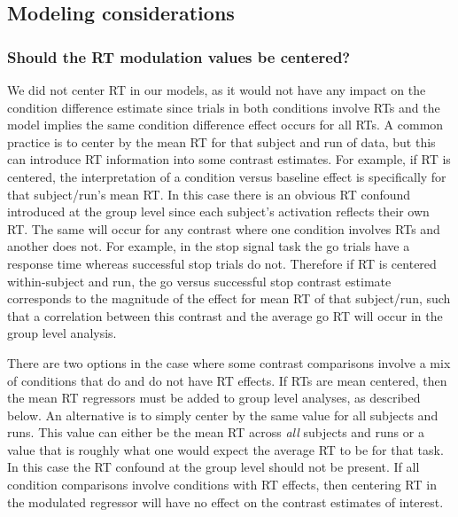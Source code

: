 \documentclass[titlepage,12pt] {article}
\begin{document}
\subsection*{Modeling considerations}


\subsubsection*{Should the RT modulation values be centered?}
We did not center RT in our models, as it would not have any impact on the condition difference estimate since trials in both conditions involve RTs and the model implies the same condition difference effect occurs for all RTs.  A common practice is to center by the mean RT for that subject and run of data, but this can introduce RT information into some contrast estimates.  For example, if RT is centered, the interpretation of a condition versus baseline effect is specifically for that subject/run's mean RT.  In this case there is an obvious RT confound introduced at the group level since each subject's activation reflects their own RT.  The same will occur for any contrast where one condition involves RTs and another does not.  For example, in the stop signal task the go trials have a response time whereas successful stop trials do not.  Therefore if RT is centered within-subject and run, the go versus successful stop contrast estimate corresponds to the magnitude of the effect for mean RT of that subject/run, such that a correlation between this contrast and the average go RT will occur in the group level analysis.

There are two options in the case where some contrast comparisons involve a mix of conditions that do and do not have RT effects.  If RTs are mean centered, then the mean RT regressors must be added to group level analyses, as described below.  An alternative is to simply center by the same value for all subjects and runs.  This value can either be the mean RT across \emph{all} subjects and runs or a value that is roughly what one would expect the average RT to be for that task.  In this case the RT confound at the group level should not be present.  If all condition comparisons involve conditions with RT effects, then centering RT in the modulated regressor will have no effect on the contrast estimates of interest.
\end{document}
